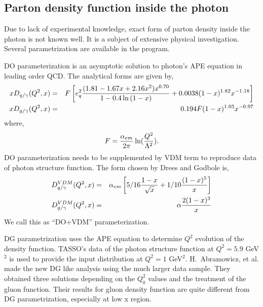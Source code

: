 \subsection{Parton density function inside the photon}

Due to lack of experimental knowledge,
exact form of parton density inside the photon
is not known well.  It is a
subject of extensive physical investigation.
Several parametrization are available in the program.

DO parameterization\cite{DO} is an asymptotic solution to
photon's APE equation in leading order QCD.
The analytical forms are given by,
\begin{eqnarray}
xD_{q/\gamma}(Q^2,x)&=&F\left[ e_q^2 
{(1.81-1.67x + 2.16x^2)x^{0.70} \over 1 - 0.4\ln{(1-x)}}
+ 0.0038(1-x)^{1.82}x^{-1.18} \right]  \\
xD_{g/\gamma}(Q^2,x)&=&0.194F(1-x)^{1.03}x^{-0.97}
\end{eqnarray}
\noindent where,
\begin{eqnarray}
F={\alpha_{em} \over 2\pi} \ln ( {Q^2 \over \Lambda^2} ).
\end{eqnarray}
DO parameterization needs to be supplemented by VDM term
to reproduce data of photon structure function.
The form chosen by Drees and Godbole\cite{DREESA} is,
\begin{eqnarray}
D^{VDM}_{q/\gamma}(Q^2,x)&=&
\alpha_{em}\left[ 5/16{1-x \over \sqrt{x}} + 1/10 {(1-x)^5 \over x} \right] \\
D^{VDM}_{g/\gamma}(Q^2,x)&=&\alpha {2(1-x)^3 \over x}
\end{eqnarray}
We call this as ``DO+VDM'' parameterization. 

DG parametrization\cite{DG} uses the APE
equation to determine $Q^2$ evolution of the density
function.
TASSO's data of the photon structure
function at $Q^2=5.9$ GeV$^2$ is used to provide the input
distribution at $Q^2 = 1$ GeV$^2$.
H.~Abramowicz, et al.\cite{LAC}
made the new DG like analysis using the
much larger data sample.  They obtained three solutions
depending on the $Q_0^2$ values and the treatment of the
gluon function.   Their results for gluon density function
are quite different from DG parametrization, especially at low x region.

